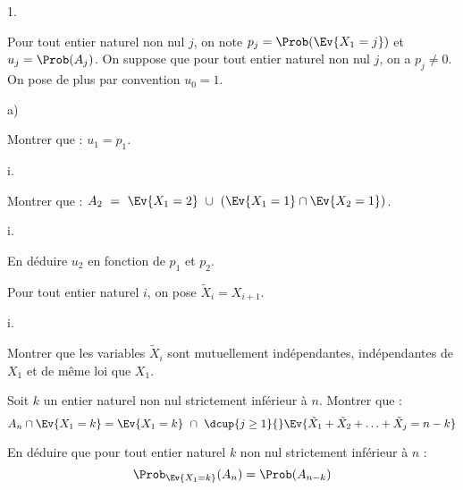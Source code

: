 \begin{noliste}{1.}
  \setlength{\itemsep}{2mm} \setcounter{enumi}{3}
\item Pour tout entier naturel non nul $j$, on note
  $p_j=\Prob(\Ev{X_1=j})$ et $u_j=\Prob(A_j)$. On suppose que pour
  tout entier naturel non nul $j$, on a $p_j \neq 0$. On pose de plus
  par convention $u_0=1$.
  \begin{noliste}{a)}
  \item Montrer que : $u_1 = p_1$.%

    
    



  \item
    \begin{nonoliste}{i.}
    \item Montrer que : $A_2 \ = \ \Ev{X_1=2} \ \cup \
      \left(\Ev{X_1=1} \cap \Ev{X_2=1}\right)$.
      \end{nonoliste}

      

      \begin{nonoliste}{i.}
        \setcounter{enumiii}{1}
    \item En déduire $u_2$ en fonction de $p_1$ et $p_2$.

      
    \end{nonoliste}




  \item Pour tout entier naturel $i$, on pose $\tilde{X}_i= X_{i+1}$.
    \begin{nonoliste}{i.}
    \item Montrer que les variables $\tilde{X}_i$ sont mutuellement
      indépendantes, indépendantes de $X_1$ et de même loi que $X_1$.

      

    \item Soit $k$ un entier naturel non nul strictement inférieur à
      $n$. Montrer que :
      \[
      A_n \cap \Ev{X_1=k}=\Ev{X_1=k} \ \cap \ \dcup{j \geq 1}{}
      \Ev{\tilde{X}_1+\tilde{X}_2+ \ldots +\tilde{X}_j=n-k}
      \]

      

    \item En déduire que pour tout entier naturel $k$ non nul
      strictement inférieur à $n$ :
      \[
      \Prob_{\Ev{X_1=k}}(A_n) = \Prob(A_{n-k})
      \]

      


\end{nonoliste}
\end{noliste}
\end{noliste}

